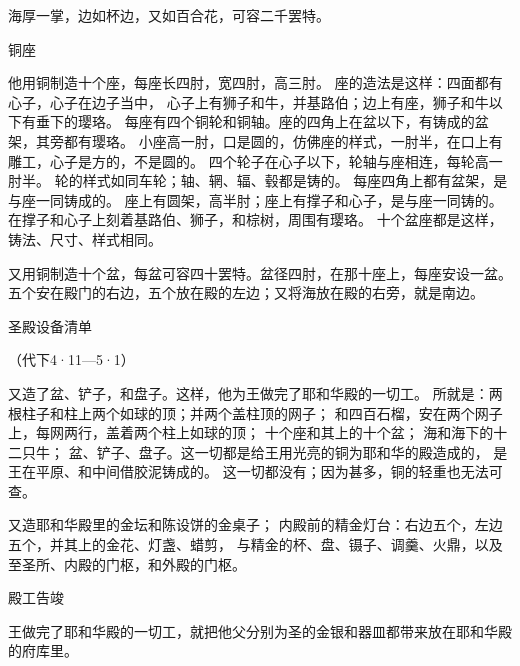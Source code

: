 {海厚一掌，边如杯边，又如百合花，可容二千罢特。
\par }{\SH 铜座
\par }{\PP {}他用铜制造十个{}座，每座长四肘，宽四肘，高三肘。
座的造法是这样：四面都有心子，心子在边子当中，
心子上有狮子和牛，并基路伯；边上有{}座，狮子和牛以下有垂下的璎珞。
每{}座有四个铜轮和铜轴。{}座的四角上在盆以下，有铸成的盆架，其旁都有璎珞。
小座高一肘，口是圆的，仿佛座的样式，{}一肘半，在口上有雕工，心子是方的，不是圆的。
四个轮子在心子以下，轮轴与座相连，每轮高一肘半。
轮的样式如同车轮；轴、辋、辐、毂都是铸的。
每座四角上都有盆架，是与座一同铸成的。
座上有圆架，高半肘；座上有撑子和心子，是与座一同铸的。
在撑子和心子上刻着基路伯、狮子，和棕树，周围有璎珞。
十个盆座都是这样，铸法、尺寸、样式相同。
\par }{\PP {}又用铜制造十个盆，每盆可容四十罢特。盆径四肘，在那十座上，每座安设一盆。
五个安在殿门的右边，五个放在殿{}的左边；又将海放在殿{}的右旁，就是南边。
\par }{\SH 圣殿设备清单
\par }{\R （代下4·11—5·1）
\par }{\PP {}又造了盆、铲子，和盘子。这样，他为{}王做完了耶和华殿的一切工。
所{}就是：两根柱子和柱上两个如球的顶；并两个盖柱顶的网子；
和四百石榴，安在两个网子上，每网两行，盖着两个柱上如球的顶；
十个座和其上的十个盆；
海和海下的十二只牛；
盆、铲子、盘子。这一切都是{}给{}王用光亮的铜为耶和华的殿造成的，
是{}王{}在{}平原、{}和{}中间借胶泥铸成的。
这一切{}都没有{}；因为甚多，铜的轻重也无法可查。
\par }{\PP {}又造耶和华殿里的金坛和陈设饼的金桌子；
内殿前的精金灯台：右边五个，左边五个，并其上的金花、灯盏、蜡剪，
与精金的杯、盘、镊子、调羹、火鼎，以及至圣所、内殿的门枢，和外殿的门枢。
\par }{\SH 殿工告竣
\par }{\PP {}王做完了耶和华殿的一切工，就把他父{}分别为圣的金银和器皿都带来放在耶和华殿的府库里。

}

